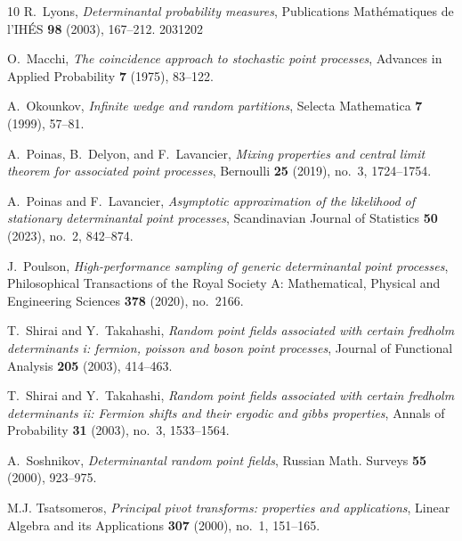 \documentclass{article}
\numberwithin{equation}{section}
\theoremstyle{plain}
\begin{document}
\begin{thebibliography}{10}
R.~Lyons, \emph{Determinantal probability measures}, Publications
  Math\'ematiques de l'IH\'ES \textbf{98} (2003), 167--212. 2031202

O.~Macchi, \emph{The coincidence approach to stochastic point processes},
  Advances in Applied Probability \textbf{7} (1975), 83--122.

A.~Okounkov, \emph{Infinite wedge and random partitions}, Selecta Mathematica
  \textbf{7} (1999), 57--81.

A.~Poinas, B.~Delyon, and F.~Lavancier, \emph{Mixing properties and central
  limit theorem for associated point processes}, Bernoulli \textbf{25} (2019),
  no.~3, 1724--1754.

A.~Poinas and F.~Lavancier, \emph{Asymptotic approximation of the likelihood of
  stationary determinantal point processes}, Scandinavian Journal of Statistics
  \textbf{50} (2023), no.~2, 842--874.

J.~Poulson, \emph{High-performance sampling of generic determinantal point
  processes}, Philosophical Transactions of the Royal Society A: Mathematical,
  Physical and Engineering Sciences \textbf{378} (2020), no.~2166.

T.~Shirai and Y.~Takahashi, \emph{Random point fields associated with certain
  fredholm determinants i: fermion, poisson and boson point processes}, Journal
  of Functional Analysis \textbf{205} (2003), 414--463.

T.~Shirai and Y.~Takahashi, \emph{Random point fields associated with certain fredholm
  determinants ii: Fermion shifts and their ergodic and gibbs properties},
  Annals of Probability \textbf{31} (2003), no.~3, 1533--1564.

A.~Soshnikov, \emph{Determinantal random point fields}, Russian Math. Surveys
  \textbf{55} (2000), 923--975.

M.J. Tsatsomeros, \emph{Principal pivot transforms: properties and
  applications}, Linear Algebra and its Applications \textbf{307} (2000),
  no.~1, 151--165.

\end{thebibliography}

\end{document}
